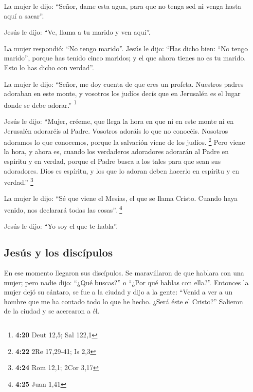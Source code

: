  La mujer le dijo: ``Señor, dame esta agua, para que no
tenga sed ni venga hasta aquí a sacar''.

 Jesús le dijo: ``Ve, llama a tu marido y ven aquí''.

 La mujer respondió: ``No tengo marido''. Jesús le dijo:
``Has dicho bien: ``No tengo marido'',  porque has tenido
cinco maridos; y el que ahora tienes no es tu marido. Esto lo has dicho
con verdad''.

 La mujer le dijo: ``Señor, me doy cuenta de que eres un
profeta.  Nuestros padres adoraban en este monte, y
vosotros los judíos decís que en Jerusalén es el lugar donde se debe
adorar.'' \footnote{\textbf{4:20} Deut 12,5; Sal 122,1}

 Jesús le dijo: ``Mujer, créeme, que llega la hora en que
ni en este monte ni en Jerusalén adoraréis al Padre. 
Vosotros adoráis lo que no conocéis. Nosotros adoramos lo que conocemos,
porque la salvación viene de los judíos. \footnote{\textbf{4:22} 2Re
  17,29-41; Is 2,3}  Pero viene la hora, y ahora es,
cuando los verdaderos adoradores adorarán al Padre en espíritu y en
verdad, porque el Padre busca a los tales para que sean sus adoradores.
 Dios es espíritu, y los que lo adoran deben hacerlo en
espíritu y en verdad.'' \footnote{\textbf{4:24} Rom 12,1; 2Cor 3,17}

 La mujer le dijo: ``Sé que viene el Mesías, el que se
llama Cristo. Cuando haya venido, nos declarará todas las cosas''.
\footnote{\textbf{4:25} Juan 1,41}

 Jesús le dijo: ``Yo soy el que te habla''.

\hypertarget{jesuxfas-y-los-discuxedpulos}{%
\subsection{Jesús y los discípulos}\label{jesuxfas-y-los-discuxedpulos}}

 En ese momento llegaron sus discípulos. Se maravillaron
de que hablara con una mujer; pero nadie dijo: ``¿Qué buscas?'' o ``¿Por
qué hablas con ella?''.  Entonces la mujer dejó su
cántaro, se fue a la ciudad y dijo a la gente:  ``Venid a
ver a un hombre que me ha contado todo lo que he hecho. ¿Será éste el
Cristo?''  Salieron de la ciudad y se acercaron a él.


